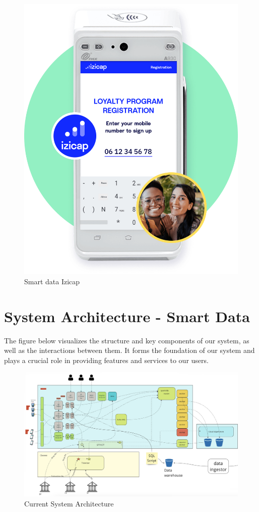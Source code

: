 \begin{figure}[H]
\centering
\includegraphics[width=0.6\linewidth]{images/smart-data-izicap.png}
\caption{Smart data Izicap}\label{fig:smart-data-Izicap}
\end{figure}

\section{System Architecture - Smart Data}

The figure below visualizes the structure and key components of our system, as well as the interactions between them. It forms the foundation of our system and plays a crucial role in providing features and services to our users.

\begin{figure}[H]
\centering
\includegraphics[width=\linewidth]{images/archi-globale.png}
\caption{Current System Architecture}\label{fig:monolithic-architecture}
\end{figure}

